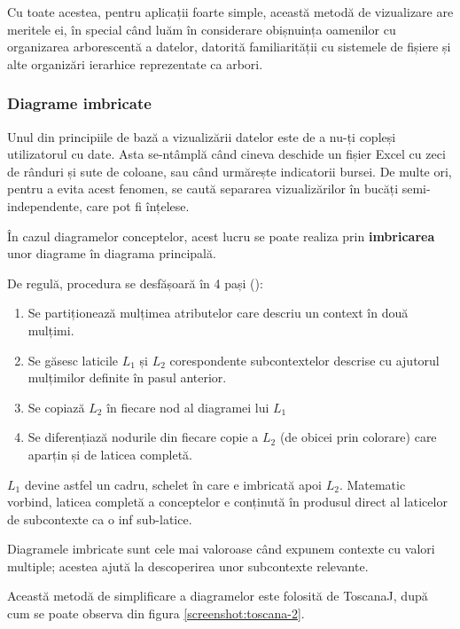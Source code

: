 \documentclass[12pt, a4paper, twoside, romanian]{teza-upb}
\begin{document}
        Cu toate acestea, pentru aplicații foarte simple, această metodă de vizualizare are meritele ei, în special când luăm în considerare obișnuința oamenilor cu organizarea arborescentă a datelor, datorită familiarității cu sistemele de fișiere și alte organizări ierarhice reprezentate ca arbori.

      \subsubsection{Diagrame imbricate}

         Unul din principiile de bază a vizualizării datelor este de a nu-ți copleși utilizatorul cu date. Asta se-ntâmplă când cineva deschide un fișier Excel cu zeci de rânduri și sute de coloane, sau când urmărește indicatorii bursei. De multe ori, pentru a evita acest fenomen, se caută separarea vizualizărilor în bucăți semi-independente, care pot fi înțelese.

         În cazul diagramelor conceptelor, acest lucru se poate realiza prin \textbf{imbricarea} unor diagrame în diagrama principală.

        De regulă, procedura se desfășoară în 4 pași (\cite{Carpineto:2004:CDA:975252}):

        \begin{enumerate}
          \item Se partiționează mulțimea atributelor care descriu un context în două mulțimi.
          \item Se găsesc laticile $L_1$ și $L_2$ corespondente subcontextelor descrise cu ajutorul mulțimilor definite în pasul anterior.
          \item Se copiază $L_2$ în fiecare nod al diagramei lui $L_1$
          \item Se diferențiază nodurile din fiecare copie a $L_2$ (de obicei prin colorare) care aparțin și de laticea completă.
        \end{enumerate}

        $L_1$ devine astfel un cadru, schelet în care e imbricată apoi $L_2$. Matematic vorbind, laticea completă a conceptelor e conținută în produsul direct al laticelor de subcontexte ca o inf sub-latice.

        Diagramele imbricate sunt cele mai valoroase când expunem contexte cu valori multiple; acestea ajută la descoperirea unor subcontexte relevante.

        Această metodă de simplificare a diagramelor este folosită de ToscanaJ, după cum se poate observa din figura \ref{screenshot:toscana-2}.
\end{document}
